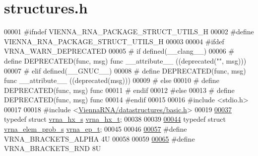 \hypertarget{utils_2structures_8h_source}{}\section{structures.\+h}
\label{utils_2structures_8h_source}

\begin{DoxyCode}
00001 \textcolor{preprocessor}{#ifndef VIENNA\_RNA\_PACKAGE\_STRUCT\_UTILS\_H}
00002 \textcolor{preprocessor}{#define VIENNA\_RNA\_PACKAGE\_STRUCT\_UTILS\_H}
00003 
00004 \textcolor{preprocessor}{#ifdef VRNA\_WARN\_DEPRECATED}
00005 \textcolor{preprocessor}{# if defined(\_\_clang\_\_)}
00006 \textcolor{preprocessor}{#  define DEPRECATED(func, msg) func \_\_attribute\_\_ ((deprecated("", msg)))}
00007 \textcolor{preprocessor}{# elif defined(\_\_GNUC\_\_)}
00008 \textcolor{preprocessor}{#  define DEPRECATED(func, msg) func \_\_attribute\_\_ ((deprecated(msg)))}
00009 \textcolor{preprocessor}{# else}
00010 \textcolor{preprocessor}{#  define DEPRECATED(func, msg) func}
00011 \textcolor{preprocessor}{# endif}
00012 \textcolor{preprocessor}{#else}
00013 \textcolor{preprocessor}{# define DEPRECATED(func, msg) func}
00014 \textcolor{preprocessor}{#endif}
00015 
00016 \textcolor{preprocessor}{#include <stdio.h>}
00017 
00018 \textcolor{preprocessor}{#include <\hyperlink{datastructures_2basic_8h}{ViennaRNA/datastructures/basic.h}>}
00019 
\hyperlink{group__struct__utils__helix__list_ga877363f3a1703b53ecd025c6fcf897a0}{00037} \textcolor{keyword}{typedef} \textcolor{keyword}{struct }\hyperlink{group__struct__utils__helix__list_structvrna__hx__s}{vrna\_hx\_s} \hyperlink{group__struct__utils__helix__list_structvrna__hx__s}{vrna\_hx\_t};
00038 
00039 
\hyperlink{group__struct__utils__plist_gab9ac98ab55ded9fb90043b024b915aca}{00044} \textcolor{keyword}{typedef} \textcolor{keyword}{struct }\hyperlink{group__struct__utils__plist_structvrna__elem__prob__s}{vrna\_elem\_prob\_s} \hyperlink{group__struct__utils__plist_structvrna__elem__prob__s}{vrna\_ep\_t};
00045 
00046 
\hyperlink{group__struct__utils__dot__bracket_ga7e3f630af8d69bb0e917145aacf2f96d}{00057} \textcolor{preprocessor}{#define VRNA\_BRACKETS\_ALPHA    4U}
00058 
00059 
\hyperlink{group__struct__utils__dot__bracket_gac92d5fa7c6625bce2670ece510a24fbd}{00065} \textcolor{preprocessor}{#define VRNA\_BRACKETS\_RND      8U}

\end{DoxyCode}
